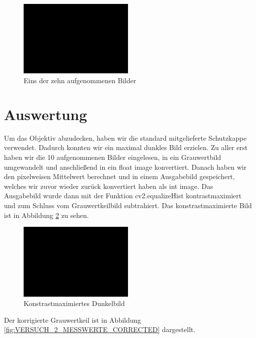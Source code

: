 \documentclass[12pt, oneside, a4paper, \docLanguage]{report}
\begin{document}
\begin{figure}[H]
	\centering\small
	\includegraphics[width=0.5\textwidth]{media/originalBlackImage_versuch2.png}
	\caption{Eins der zehn aufgenommenen Bilder}
	\label{fig:VERSUCH_2_MESSWERTE_ORIGINAL}
\end{figure}

\section{Auswertung}
\label{chap:VERSUCH_2_AUSWERTUNG}
Um das Objektiv abzudecken, haben wir die standard mitgelieferte Schutzkappe verwendet. Dadurch konnten wir ein maximal dunkles Bild erzielen.
Zu aller erst haben wir die 10 aufgenommenen Bilder eingelesen, in ein Grauwertbild umgewandelt und anschließend in ein float image konvertiert. Danach haben wir den pixelweisen Mittelwert berechnet und in einem Ausgabebild gespeichert, welches wir zuvor wieder zurück konvertiert haben als int image. Das Ausgabebild wurde dann mit der Funktion cv2.equalizeHist kontrastmaximiert und zum Schluss vom Grauwertkeilbild subtrahiert. Das konstrastmaximierte Bild ist in Abbildung \ref{fig:VERSUCH_2_MESSWERTE_CONSTRAST} zu sehen.

\begin{figure}[H]
	\centering\small
	\includegraphics[width=0.5\textwidth]{media/maxContrastBlackImage_versuch2.png}
	\caption{Konstrastmaximiertes Dunkelbild}
	\label{fig:VERSUCH_2_MESSWERTE_CONSTRAST}
\end{figure}

Der korrigierte Grauwertkeil ist in Abbildung \ref{fig:VERSUCH_2_MESSWERTE_CORRECTED} dargestellt.
\end{document}
